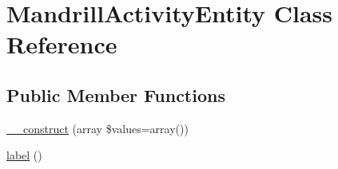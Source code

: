 \hypertarget{classMandrillActivityEntity}{
\section{MandrillActivityEntity Class Reference}
\label{classMandrillActivityEntity}
}
\subsection*{Public Member Functions}
\begin{DoxyCompactItemize}
\item 
\hyperlink{classMandrillActivityEntity_a4b874437ce13adf33df3a3b91213aa9c}{\_\-\_\-construct} (array \$values=array())
\item 
\hyperlink{classMandrillActivityEntity_a9c2c391203d8a77f91e3de71dff0650b}{label} ()
\end{DoxyCompactItemize}
